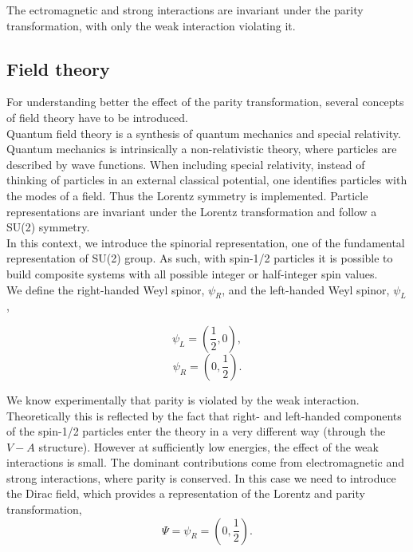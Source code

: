 \documentclass[10pt,swedish, openany]{book}
\begin{document}
The ectromagnetic and strong interactions are invariant under the parity transformation, with only the weak interaction violating it.\\

\subsection{Field theory}

For understanding better the effect of the parity transformation, several concepts of field theory have to be introduced.\\

Quantum field theory is a synthesis of quantum mechanics and special relativity. Quantum mechanics is intrinsically a non-relativistic theory, where particles are described by wave functions. When including special relativity, instead of thinking of particles in an external classical potential, one identifies particles with the modes of a field. Thus the Lorentz symmetry is implemented. Particle representations are invariant under the Lorentz transformation and follow a SU(2) symmetry.\\

In this context, we introduce the spinorial representation, one of the fundamental representation of SU(2) group. As such, with spin-1/2 particles it is possible to build composite systems with all possible integer or half-integer spin values.\\

We define the right-handed Weyl spinor, $\psi_R$, and the left-handed Weyl spinor, $\psi_L$, 

\begin{equation}
    \psi_L = (\frac{1}{2},0), 
\end{equation}
\begin{equation}
    \psi_R = (0,\frac{1}{2}).
\end{equation}

We know experimentally that parity is violated by the weak interaction. Theoretically this is reflected by the fact that right- and left-handed components of the spin-1/2 particles enter the theory in a very different way (through the $V-A$ structure). However at sufficiently low energies, the effect of the weak interactions is small. The dominant contributions come from electromagnetic and strong interactions, where parity is conserved. In this case we need to introduce the Dirac field, which provides a representation of the Lorentz and parity transformation,
\begin{equation}
    \Psi = \psi_R = (0,\frac{1}{2}).
\end{equation}
\end{document}
